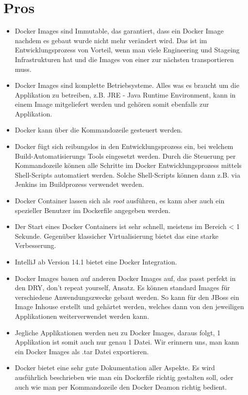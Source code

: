 \section{Pros}

\begin{itemize}

\item Docker Images sind Immutable, das garantiert, dass ein Docker Image nachdem es gebaut wurde
nicht mehr verändert wird. Das ist im Entwicklungsprozess von Vorteil, wenn man viele Engineering und
Stageing Infrastrukturen hat und die Images von einer zur nächsten transportieren muss.

\item Docker Images sind komplette Betriebsysteme. Alles was es braucht um die Applikation
zu betreiben, z.B. JRE - Java Runtime Environment, kann in einem Image mitgeliefert werden
und gehören somit ebenfalls zur Applikation.

\item Docker kann über die Kommandozeile gesteuert werden.

\item Docker fügt sich reibungslos in den Entwicklungsprozess ein, bei welchem Build-Automatisierungs
Tools eingesetzt werden. Durch die Steuerung per Kommandozeile können alle Schritte im Docker
Entwicklungsprozess mittels Shell-Scripts automatiert werden. Solche Shell-Scripts können dann z.B.
via Jenkins im Buildprozess verwendet werden.

\item Docker Container lassen sich als \textit{root} ausführen, es kann aber auch ein spezieller
Benutzer im Dockerfile angegeben werden.

\item Der Start eines Docker Containers ist sehr schnell, meistens im Bereich < 1 Sekunde.
Gegenüber klassicher Virtualisierung bietet das eine starke Verbesserung.

\item IntelliJ ab Version 14.1 bietet eine Docker Integration.

\item Docker Images bauen auf anderen Docker Images auf, das passt perfekt in den DRY, don't repeat
yourself, Ansatz. Es können standard Images für verschiedene Anwendungszwecke gebaut werden. So kann
für den JBoss ein Image Inhouse erstellt und gehärtet werden, welches dann von den jeweiligen
Applikationen weiterverwendet werden kann.

\item Jegliche Applikationen werden neu zu Docker Images, daraus folgt, 1 Applikation ist somit auch nur genau
1 Datei. Wir erinnern uns, man kann ein Docker Images als .tar Datei exportieren.

\item Docker bietet eine sehr gute Dokumentation aller Aspekte. Es wird ausführlich beschrieben
wie man ein Dockerfile richtig gestalten soll, oder auch wie man per Kommandozeile den Docker
Deamon richtig bedient.

\end{itemize}

